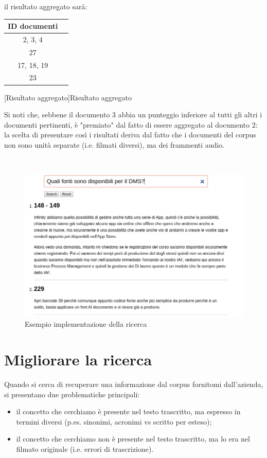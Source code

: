 il risultato aggregato sarà:

    \begin{center}
        \begin{tabular}{cc}
            \toprule
            ID documenti \\
            \midrule
            2, 3, 4 \\
            27\\
            17, 18, 19\\
            23\\
            \bottomrule
        \end{tabular}
            [Risultato aggregato]{Risultato aggregato} 
            \label{tab:risultatoAggregato}
        \end{center}
Si noti che, sebbene il documento 3 abbia un punteggio inferiore al tutti gli altri i documenti pertinenti, è "premiato" dal fatto di essere aggregato al documento 2: la scelta di presentare così i risultati deriva dal fatto che i documenti del \gls{corpus} non sono unità separate (i.e. filmati diversi), ma dei frammenti audio.


\\
\begin{figure}
    \includegraphics[scale=0.45]{immagini/ricerca.png}
    \caption{Esempio implementazione della ricerca}
    \label{fig:esempioImplRicerca}
 \end{figure}

\section{Migliorare la ricerca}
Quando si cerca di recuperare una informazione dal \gls{corpus} fornitomi dall'azienda, si presentano due problematiche principali:
\begin{itemize}
    \item il concetto che cerchiamo è presente nel testo trascritto, ma espresso in termini diversi (p.es. sinonimi, acronimi vs scritto per esteso);
    \item il concetto che cerchiamo non è presente nel testo trascritto, ma lo era nel filmato originale (i.e. errori di trascrizione). 
\end{itemize}

